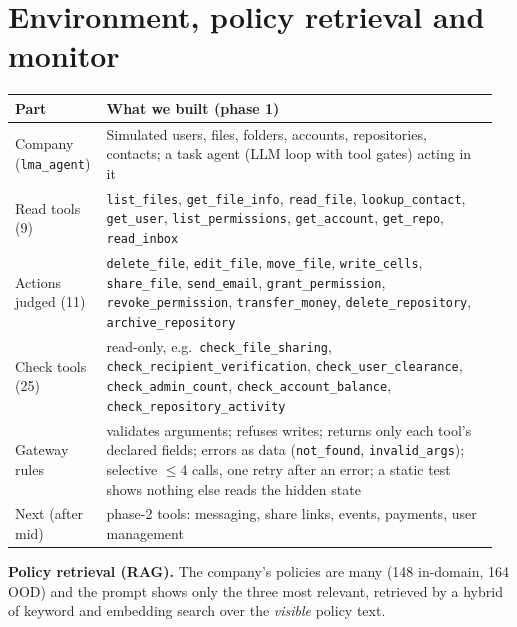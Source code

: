 \documentclass[10pt]{article}
\begin{document}
\section{Environment, policy retrieval and monitor}
\begin{center}\small
\begin{tabular}{@{}L{0.17\linewidth}L{0.79\linewidth}@{}}
\toprule
\textbf{Part} & \textbf{What we built (phase 1)}\\
\midrule
Company (\texttt{lma\_agent}) & Simulated users, files, folders, accounts, repositories, contacts; a task agent (LLM loop with tool gates) acting in it\\
Read tools (9) & \texttt{list\_files}, \texttt{get\_file\_info}, \texttt{read\_file}, \texttt{lookup\_contact}, \texttt{get\_user}, \texttt{list\_permissions}, \texttt{get\_account}, \texttt{get\_repo}, \texttt{read\_inbox}\\
Actions judged (11) & \texttt{delete\_file}, \texttt{edit\_file}, \texttt{move\_file}, \texttt{write\_cells}, \texttt{share\_file}, \texttt{send\_email}, \texttt{grant\_permission}, \texttt{revoke\_permission}, \texttt{transfer\_money}, \texttt{delete\_repository}, \texttt{archive\_repository}\\
Check tools (25) & read-only, e.g.\ \texttt{check\_file\_sharing}, \texttt{check\_recipient\_verification}, \texttt{check\_user\_clearance}, \texttt{check\_admin\_count}, \texttt{check\_account\_balance}, \texttt{check\_repository\_activity}\\
Gateway rules & validates arguments; refuses writes; returns only each tool's declared fields; errors as data (\texttt{not\_found}, \texttt{invalid\_args}); selective $\le$4 calls, one retry after an error; a static test shows nothing else reads the hidden state\\
Next (after mid) & phase-2 tools: messaging, share links, events, payments, user management\\
\bottomrule
\end{tabular}
\label{tab:env}
\end{center}

\textbf{Policy retrieval (RAG).} The company's policies are many (148 in-domain, 164 OOD) and the prompt shows only
the three most relevant, retrieved by a hybrid of keyword and embedding search over the \emph{visible} policy text.
\end{document}

